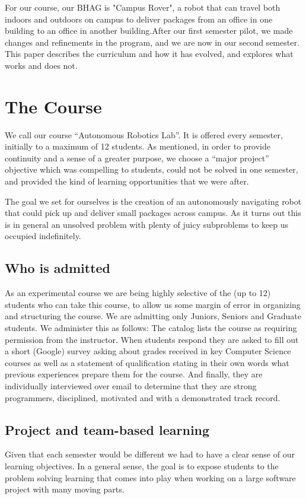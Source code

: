 For our course, our BHAG is "Campus Rover", a robot that can travel both indoors and outdoors on campus to deliver packages from an office in one building to an office in another building.After our first semester pilot, we made changes and refinements in the program, and we are now in our second semester. This paper describes the curriculum and how it has evolved, and explores what works and does not.

\section{The Course}

We call our course “Autonomous Robotics Lab”. It is offered every semester, initially to a maximum of 12 students. As mentioned, in order to provide continuity and a sense of a greater purpose, we choose a “major project” objective which was compelling to students, could not be solved in one semester, and provided the kind of learning opportunities that we were after. 

The goal we set for ourselves is the creation of an autonomously navigating robot that could pick up and deliver small packages across campus. As it turns out this is in general an unsolved problem with plenty of juicy subproblems to keep us occupied indefinitely.

\subsection{Who is admitted} As an experimental course we are being highly selective of the (up to 12) students who can take this course, to allow us some margin of error in organizing and structuring the course. We are admitting only Juniors, Seniors and Graduate students. We administer this as follows: The catalog lists the course as requiring permission from the instructor. When students respond they are asked to fill out a short (Google) survey asking about grades received in key Computer Science courses as well as a statement of qualification stating in their own words what previous experiences prepare them for the course. And finally, they are individually interviewed over email to determine that they are strong programmers, disciplined, motivated and with a demonstrated track record.

\subsection{Project and team-based learning} Given that each semester would be different we had to have a clear sense of our learning objectives. In a general sense, the goal is to expose students to the problem solving learning that comes into play when working on a large software project with many moving parts.


